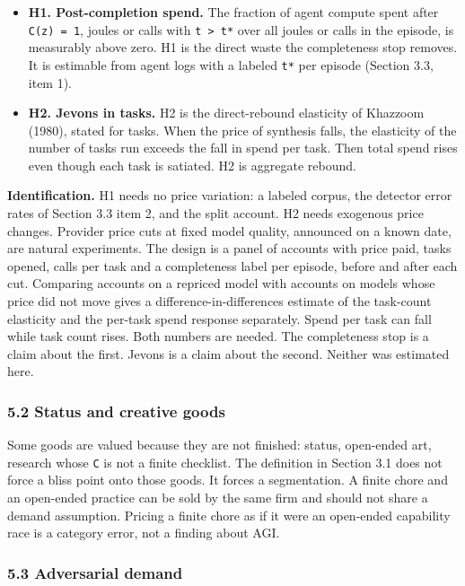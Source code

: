 \documentclass[
  10pt,
]{article}
\providecommand{\tightlist}{%
  \setlength{\itemsep}{0pt}\setlength{\parskip}{0pt}}
\begin{document}
\begin{itemize}
\tightlist
\item
  \textbf{H1. Post-completion spend.} The fraction of agent compute
  spent after \texttt{C(z)\ =\ 1}, joules or calls with
  \texttt{t\ \textgreater{}\ t*} over all joules or calls in the
  episode, is measurably above zero. H1 is the direct waste the
  completeness stop removes. It is estimable from agent logs with a
  labeled \texttt{t*} per episode (Section 3.3, item 1).
\item
  \textbf{H2. Jevons in tasks.} H2 is the direct-rebound elasticity of
  Khazzoom (1980), stated for tasks. When the price of synthesis falls,
  the elasticity of the number of tasks run exceeds the fall in spend
  per task. Then total spend rises even though each task is satiated. H2
  is aggregate rebound.
\end{itemize}

\textbf{Identification.} H1 needs no price variation: a labeled corpus,
the detector error rates of Section 3.3 item 2, and the split account.
H2 needs exogenous price changes. Provider price cuts at fixed model
quality, announced on a known date, are natural experiments. The design
is a panel of accounts with price paid, tasks opened, calls per task and
a completeness label per episode, before and after each cut. Comparing
accounts on a repriced model with accounts on models whose price did not
move gives a difference-in-differences estimate of the task-count
elasticity and the per-task spend response separately. Spend per task
can fall while task count rises. Both numbers are needed. The
completeness stop is a claim about the first. Jevons is a claim about
the second. Neither was estimated here.

\subsubsection{5.2 Status and creative
goods}\label{status-and-creative-goods}

Some goods are valued because they are not finished: status, open-ended
art, research whose \texttt{C} is not a finite checklist. The definition
in Section 3.1 does not force a bliss point onto those goods. It forces
a segmentation. A finite chore and an open-ended practice can be sold by
the same firm and should not share a demand assumption. Pricing a finite
chore as if it were an open-ended capability race is a category error,
not a finding about AGI.

\subsubsection{5.3 Adversarial demand}\label{adversarial-demand}
\end{document}
